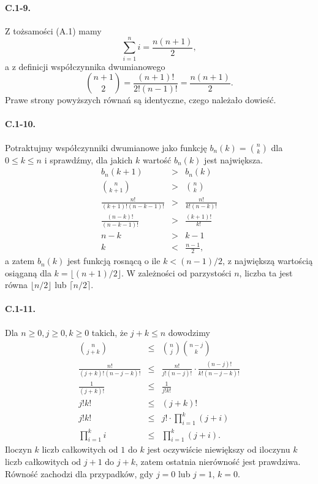 \paragraph{C.1-9.}
Z tożsamości (A.1) mamy
\[
	\sum_{i=1}^ni = \frac{n(n+1)}{2},
\]
a z definicji współczynnika dwumianowego
\[
	\binom{n+1}{2} = \frac{(n+1)!}{2!(n-1)!} = \frac{n(n+1)}{2}.
\]
Prawe strony powyższych równań są identyczne, czego należało dowieść.

\paragraph{C.1-10.}
Potraktujmy współczynniki dwumianowe jako funkcję $b_n(k)=\binom{n}{k}$ dla $0\le k\le n$ i sprawdźmy, dla jakich $k$ wartość $b_n(k)$ jest największa.
\begin{eqnarray*}
	b_n(k+1) &>& b_n(k) \\
	\binom{n}{k+1} &>& \binom{n}{k} \\
	\frac{n!}{(k+1)!(n-k-1)!} &>& \frac{n!}{k!(n-k)!} \\
	\frac{(n-k)!}{(n-k-1)!} &>& \frac{(k+1)!}{k!} \\
	n-k &>& k-1 \\
	k &<& \frac{n-1}{2},
\end{eqnarray*}
a zatem $b_n(k)$ jest funkcją rosnącą o ile $k<(n-1)/2$, z największą wartością osiąganą dla $k=\lfloor(n+1)/2\rfloor$. W zależności od parzystości $n$, liczba ta jest równa $\lfloor n/2\rfloor$ lub $\lceil n/2\rceil$.

\paragraph{C.1-11.}
Dla $n\ge 0, j\ge 0, k\ge 0$ takich, że $j+k\le n$ dowodzimy
\begin{eqnarray*}
	\binom{n}{j+k} &\le& \binom{n}{j}\binom{n-j}{k} \\
	\frac{n!}{(j+k)!(n-j-k)!} &\le& \frac{n!}{j!(n-j)!}\cdot\frac{(n-j)!}{k!(n-j-k)!} \\
	\frac{1}{(j+k)!} &\le& \frac{1}{j!k!} \\
	j!k! &\le& (j+k)! \\
	j!k! &\le& j!\cdot\prod_{i=1}^k(j+i) \\
	\prod_{i=1}^ki &\le& \prod_{i=1}^k(j+i).
\end{eqnarray*}
Iloczyn $k$ liczb całkowitych od $1$ do $k$ jest oczywiście niewiększy od iloczynu $k$ liczb całkowitych od $j+1$ do $j+k$, zatem ostatnia nierówność jest prawdziwa. Równość zachodzi dla przypadków, gdy $j=0$ lub $j=1$, $k=0$.

